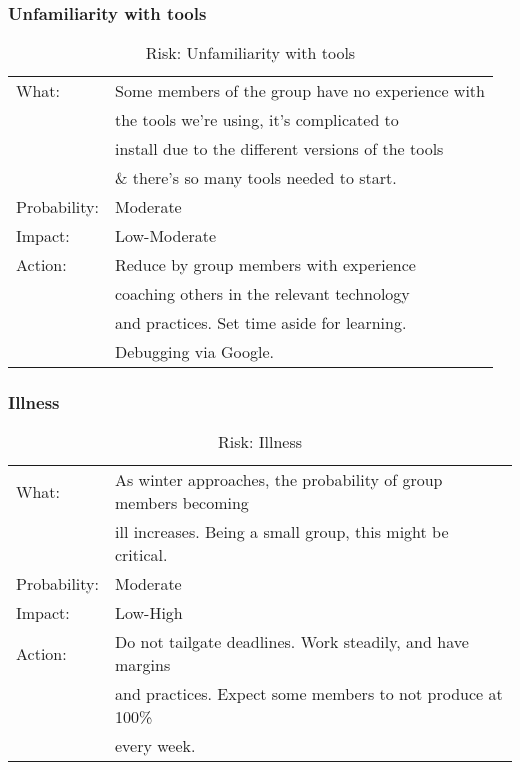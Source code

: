 \subsubsection{Unfamiliarity with tools}
\begin{table}[H]
\begin{tabular}{| l | l |}
	\hline
	What: & Some members of the group have no experience with\\
	& the tools we're using, it's complicated to\\
	& install due to the different versions of the tools \\
	& \& there's so many tools needed to start.\\
	\hline
	Probability: & Moderate \\
	\hline
	Impact: & Low-Moderate \\
	\hline
	Action: & Reduce by group members with experience \\
	& coaching others in the relevant technology\\
	& and practices. Set time aside for learning.\\
	& Debugging via Google.\\
	\hline
\end{tabular}
\caption{Risk: Unfamiliarity with tools}
\end{table}

\subsubsection{Illness}
\begin{table}[H]
\begin{tabular}{| l | l |}
	\hline
	What: & As winter approaches, the probability of group members becoming \\	 & ill increases. Being a small group, this might be critical.\\
	\hline
	Probability: & Moderate \\
	\hline
	Impact: & Low-High \\
	\hline
	Action: & Do not tailgate deadlines. Work steadily, and have margins\\
	&and practices. Expect some members to not produce at 100\%\\	& every week.\\
	\hline
\end{tabular}
\caption{Risk: Illness}
\end{table}

